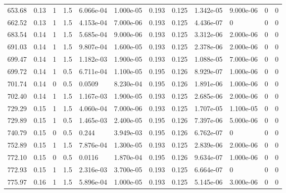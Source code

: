 \documentclass[preview]{standalone}
\begin{document}
{{\begin{tabular}{L{1.2cm}C{1.2cm} C{0.3cm}C{0.5cm} C{1.4cm}C{1.4cm} C{1.4cm}C{1.4cm} C{1.6cm}C{1.6cm} C{1.6cm}C{1.6cm}}
  653.68  &  0.13  & 1     & 1.5 &  6.066e-04  & 1.000e-05  &  0.193&   0.125& 1.342e-05 & 9.000e-06   &  0 & 0  \\ 
  662.52  &  0.13  & 1     & 1.5 &  4.153e-04  & 7.000e-06  &  0.193&   0.125& 4.436e-07 & 0   &  0 & 0  \\ 
  683.54  &  0.14  & 1     & 1.5 &  5.685e-04  & 9.000e-06  &  0.193&   0.125& 3.312e-06 & 2.000e-06   &  0 & 0  \\ 
  691.03  &  0.14  & 1     & 1.5 &  9.807e-04  & 1.600e-05  &  0.193&   0.125& 2.378e-06 & 2.000e-06   &  0 & 0  \\ 
  699.47  &  0.14  & 1     & 1.5 &  1.182e-03  & 1.900e-05  &  0.193&   0.125& 1.088e-05 & 7.000e-06   &  0 & 0  \\ 
  699.72  &  0.14  & 1     & 0.5 &  6.711e-04  & 1.100e-05  &  0.195&   0.126& 8.929e-07 & 1.000e-06   &  0 & 0  \\ 
  701.74  &  0.14  & 0     & 0.5 &  0.0509  & 8.230e-04  &  0.195&   0.126& 1.891e-06 & 1.000e-06   &  0 & 0  \\ 
  702.40  &  0.14  & 1     & 1.5 &  1.167e-03  & 1.900e-05  &  0.193&   0.125& 2.685e-06 & 2.000e-06   &  0 & 0  \\ 
  729.29  &  0.15  & 1     & 1.5 &  4.060e-04  & 7.000e-06  &  0.193&   0.125& 1.707e-05 & 1.100e-05   &  0 & 0  \\ 
  729.89  &  0.15  & 1     & 0.5 &  1.465e-03  & 2.400e-05  &  0.195&   0.126& 7.397e-06 & 5.000e-06   &  0 & 0  \\ 
  740.79  &  0.15  & 0     & 0.5 &  0.244  & 3.949e-03  &  0.195&   0.126& 6.762e-07 & 0   &  0 & 0  \\ 
  752.89  &  0.15  & 1     & 1.5 &  7.876e-04  & 1.300e-05  &  0.193&   0.125& 2.839e-06 & 2.000e-06   &  0 & 0  \\ 
  772.10  &  0.15  & 0     & 0.5 &  0.0116  & 1.870e-04  &  0.195&   0.126& 9.634e-07 & 1.000e-06   &  0 & 0  \\ 
  772.93  &  0.15  & 1     & 1.5 &  2.316e-03  & 3.700e-05  &  0.193&   0.125& 6.664e-07 & 0   &  0 & 0  \\ 
  775.97  &  0.16  & 1     & 1.5 &  5.896e-04  & 1.000e-05  &  0.193&   0.125& 5.145e-06 & 3.000e-06   &  0 & 0  \\ 
\hline 
\end{tabular} 

}}
\end{document}
